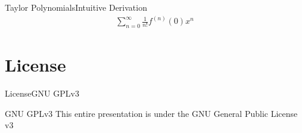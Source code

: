 \documentclass[10pt]{beamer}
\begin{document}
\begin{frame}{Taylor Polynomials}{Intuitive Derivation}
	\begin{align*}
	\sum\limits_{n=0}^{\infty}\frac{1}{n!}f^{(n)}\left(0\right)x^n
	\end{align*}
	
\end{frame}

\section{License}
\begin{frame}{License}{GNU GPLv3}
	\begin{block}{GNU GPLv3}
		This entire presentation is under the GNU General Public License v3\\
		\begin{figure}
			\centering
			\def\svgwidth{\columnwidth}
			
		\end{figure}
	\end{block}
	
\end{frame}
\end{document}
